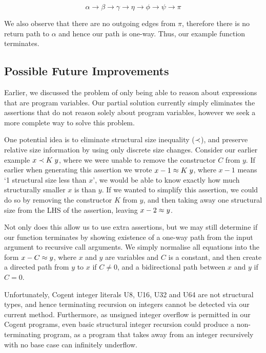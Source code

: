 \[
    \alpha \rightarrow \beta \rightarrow \gamma \rightarrow
    \eta   \rightarrow \phi  \rightarrow \psi   \rightarrow
    \pi
\]

We also observe that there are no outgoing edges from $\pi$, therefore there is no return path
to $\alpha$ and hence our path is one-way. Thus, our example function terminates.

\subsection{Possible Future Improvements}

Earlier, we discussed the problem of only being able to reason about expressions that are
program variables. Our partial solution currently simply eliminates the assertions that
do not reason solely about program variables, however we seek a more complete way to solve
this problem.

One potential idea is to eliminate structural size inequality ($\prec$), and preserve relative
size information by using only discrete size changes. Consider our earlier example $x \prec K\; y$,
where we were unable to remove the constructor $C$ from $y$. 
If earlier when generating this assertion we wrote  $x - 1 \approx K\; y$,
where $x - 1$ means `1 structural size less than $x$', we would be able to know exactly
how much structurally smaller $x$ is than $y$. If we wanted to simplify this assertion,
we could do so by removing the constructor $K$ from $y$, and then taking away one structural size from
the LHS of the assertion, leaving $x - 2 \approx y$.

Not only does this allow us to use extra assertions, but we may still determine 
if our function terminates by showing existence of a one-way path from the input
argument to recursive call arguments. We simply normalise all equations into the
form $x - C \approx y$, where $x$ and $y$ are variables and $C$ is a constant, and
then create a directed path from $y$ to $x$ if $C \neq 0$, and a bidirectional
path between $x$ and $y$ if $C = 0$.

Unfortunately, Cogent integer literals \textsc{U8}, \textsc{U16}, \textsc{U32} and
\textsf{U64} are not structural types, and hence terminating recursion on integers
cannot be detected via our current method. Furthermore, as unsigned integer
overflow is permitted in our Cogent programs, even basic structural integer
recursion could produce a non-terminating program, as a program that takes
away from an integer recursively with no base case can infinitely underflow.

